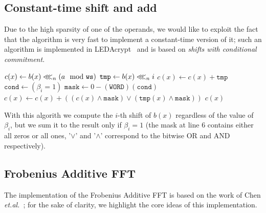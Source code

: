 	\subsection{Constant-time shift and add}\label{subsec:const_shift_add}
		Due to the high sparsity of one of the operands, we would like to exploit the fact that the algorithm is very fast to implement a constant-time version of it;
		such an algorithm is implemented in LEDAcrypt~\cite{DBLP:conf/cbc/BaldiBCPS19} and is based on \textit{shifts with conditional commitment}.\\

		\begin{algorithm2e}[H]
			\caption{Constant-time monomial multiplication}

            $c(x) \gets b(x) \lll_n (a \mod \texttt{ws})$\;
             {
                $\texttt{tmp} \gets b(x) \lll_n i$\;
                $c(x) \gets c(x) + \texttt{tmp}$\;
                $\texttt{cond} \gets (\beta_{i} = 1)$\;
                $\texttt{mask} \gets 0 - (\texttt{WORD})(\texttt{cond})$\;
                $c(x) \gets c(x) + ((c(x) \wedge \texttt{mask}) \vee (\texttt{tmp}(x) \wedge \texttt{mask}))$\;
            }
            \KwRet $c(x)$\;
            
		\end{algorithm2e}
		With this algorith we compute the $i$-th shift of $b(x)$ regardless of the value of $\beta_i$, but we sum it to the result only if
		$\beta_i = 1$ (the mask at line 6 contains either all zeros or all ones, '$\vee$' and '$\wedge$' correspond to the bitwise OR and AND respectively).

    \subsection{Frobenius Additive FFT}\label{subsec:fafft}
        The implementation of the Frobenius Additive FFT is based on the work of Chen \textit{et.al.}~\cite{DBLP:journals/tches/ChenCK21}; for the sake of clarity, 
        we highlight the core ideas of this implementation.
        
